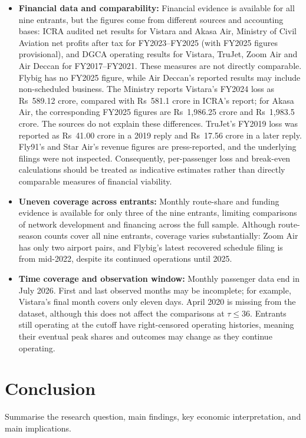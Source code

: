 \documentclass[12pt,a4paper]{article}
\newenvironment{o3box}{\ifthenelse{\boolean{o3highlight}}{\begingroup\color{o3sky}}{}}{\ifthenelse{\boolean{o3highlight}}{\endgroup}{}}
\begin{document}
\begin{o3box}
\begin{itemize}
    \item \textbf{Financial data and comparability:} Financial evidence is available for all nine entrants, but the figures come from different sources and accounting bases: ICRA audited net results for Vistara and Akasa Air, Ministry of Civil Aviation net profits after tax for FY2023--FY2025 (with FY2025 figures provisional), and DGCA operating results for Vistara, TruJet, Zoom Air and Air Deccan for FY2017--FY2021. These measures are not directly comparable. Flybig has no FY2025 figure, while Air Deccan's reported results may include non-scheduled business. The Ministry reports Vistara's FY2024 loss as Rs~589.12 crore, compared with Rs~581.1 crore in ICRA's report; for Akasa Air, the corresponding FY2025 figures are Rs~1,986.25 crore and Rs~1,983.5 crore. The sources do not explain these differences. TruJet's FY2019 loss was reported as Rs~41.00 crore in a 2019 reply and Rs~17.56 crore in a later reply. Fly91's and Star Air's revenue figures are press-reported, and the underlying filings were not inspected. Consequently, per-passenger loss and break-even calculations should be treated as indicative estimates rather than directly comparable measures of financial viability.

  \item \textbf{Uneven coverage across entrants:} Monthly route-share and funding evidence is available for only three of the nine entrants, limiting comparisons of network development and financing across the full sample. Although route-season counts cover all nine entrants, coverage varies substantially: Zoom Air has only two airport pairs, and Flybig's latest recovered schedule filing is from mid-2022, despite its continued operations until 2025.

    \item \textbf{Time coverage and observation window:} Monthly passenger data end in July 2026. First and last observed months may be incomplete; for example, Vistara's final month covers only eleven days. April 2020 is missing from the dataset, although this does not affect the comparisons at $\tau\leq36$. Entrants still operating at the cutoff have right-censored operating histories, meaning their eventual peak shares and outcomes may change as they continue operating.
\end{itemize}
\end{o3box}

\section{Conclusion}
Summarise the research question, main findings, key economic interpretation, and main implications.
\end{document}
